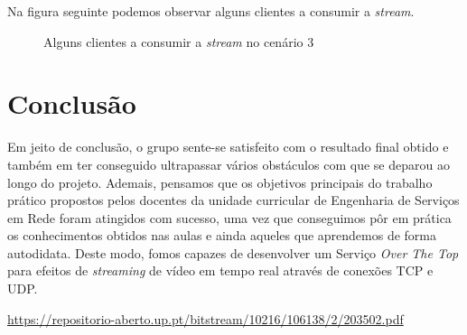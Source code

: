 \documentclass[a4paper, 11pt]{article}
\begin{document}
Na figura seguinte podemos observar alguns clientes a consumir a \textit{stream}.

\begin{figure}[H]
    \centering
    \caption {Alguns clientes a consumir a \textit{stream} no cenário 3}
\end{figure}



\section{Conclusão}

Em jeito de conclusão, o grupo sente-se satisfeito com o resultado final obtido e também em ter conseguido ultrapassar vários obstáculos com que se deparou ao longo do projeto. Ademais, pensamos que os objetivos principais do trabalho prático propostos pelos docentes da unidade curricular de Engenharia de Serviços em Rede foram atingidos com sucesso, uma vez que conseguimos pôr em prática os conhecimentos obtidos nas aulas e ainda aqueles que aprendemos de forma autodidata. Deste modo, fomos capazes de desenvolver um Serviço \textit{Over The Top} para efeitos de \textit{streaming} de vídeo em tempo real através de conexões TCP e UDP.


\clearpage
\begin{thebibliography}{}


\url{https://repositorio-aberto.up.pt/bitstream/10216/106138/2/203502.pdf}


\end{thebibliography}
\end{document}
